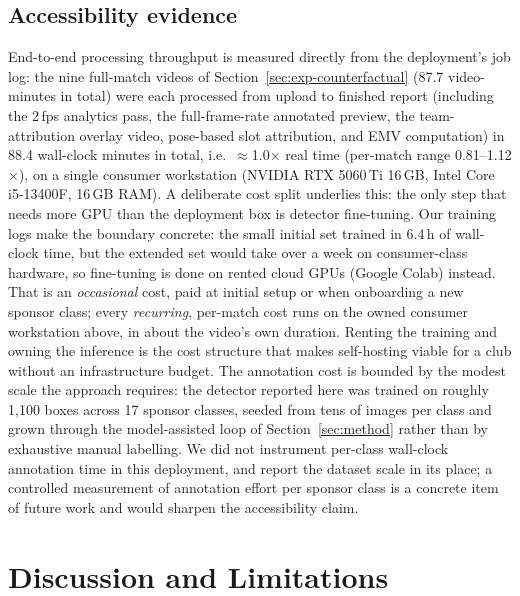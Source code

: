 \documentclass[conference,a4paper]{IEEEtran}
\begin{document}
\subsection{Accessibility evidence}
End-to-end processing throughput is measured directly from the deployment's job log:
the nine full-match videos of Section~\ref{sec:exp-counterfactual} (87.7 video-minutes in
total) were each processed from upload to finished report (including the 2\,fps
analytics pass, the full-frame-rate annotated preview, the team-attribution overlay
video, pose-based slot attribution, and EMV computation) in 88.4 wall-clock minutes
in total, i.e.\ $\approx$1.0$\times$ real time (per-match range
0.81--1.12$\times$), on a single consumer workstation (NVIDIA RTX 5060\,Ti 16\,GB,
Intel Core i5-13400F, 16\,GB RAM). A deliberate cost split underlies this: the only step that needs more GPU than the
deployment box is detector fine-tuning. Our training logs make the boundary
concrete: the small initial set trained in 6.4\,h of wall-clock time, but the
extended set would take over a week on consumer-class hardware, so fine-tuning is
done on rented cloud GPUs (Google Colab) instead. That is an \emph{occasional} cost,
paid at initial setup or when onboarding a new sponsor class; every
\emph{recurring}, per-match cost runs on the owned consumer workstation above, in
about the video's own duration. Renting the training and owning the inference is the
cost structure that makes self-hosting viable for a club without an infrastructure
budget. The annotation cost is bounded by the modest scale the approach requires: the
detector reported here was trained on roughly 1{,}100 boxes across 17 sponsor classes,
seeded from tens of images per class and grown through the model-assisted loop of
Section~\ref{sec:method} rather than by exhaustive manual labelling. We did not instrument
per-class wall-clock annotation time in this deployment, and report the dataset scale
in its place; a controlled measurement of annotation effort per sponsor class is a
concrete item of future work and would sharpen the accessibility claim.

\section{Discussion and Limitations}
\label{sec:discussion}
\end{document}
